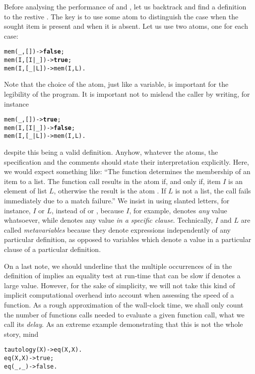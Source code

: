 Before analysing the performance of  and
, let us backtrack and find a definition to the
restive . The key is to use some atom to distinguish
the case when the sought item is present and when it is absent. Let us
use two atoms, one for each case:
\begin{alltt}
mem(_,   []) -> \textbf{false};
mem(I,[I|_]) -> \textbf{true};
mem(I,[_|L]) -> mem(I,L).
\end{alltt}
Note that the choice of the atom, just like a variable, is important
for the legibility of the program. It is important not to mislead the
caller by writing, for instance
\begin{alltt}
mem(_,   []) -> \textbf{true};
mem(I,[I|_]) -> \textbf{false};
mem(I,[_|L]) -> mem(I,L).
\end{alltt}
despite this being a valid definition. Anyhow, whatever the atoms, the
specification and the comments should state their interpretation
explicitly. Here, we would expect something like: ``The function
 determines the membership of an item to a list. The
function call  results in the atom
 if, and only if, item \(I\) is an element of list
\(L\), otherwise the result is the atom . If \(L\) is
not a list, the call fails immediately due to a match failure.'' We
insist in using slanted letters, for instance, \(I\) or \(L\), instead of
 or , because \(I\), for example, denotes
\emph{any} \Erlang value whatsoever, while  denotes any
\Erlang value \emph{in a specific clause}. Technically, \(I\) and
\(L\) are called \emph{metavariables} because they denote \Erlang
expressions independently of any particular definition, as opposed to
variables which denote a value in a particular clause of a particular
definition.

On a last note, we should underline that the multiple occurrences of
 in the definition of  implies an equality
test at run\hyp{}time that can be slow if  denotes a large
value. However, for the sake of simplicity, we will not take this kind
of implicit computational overhead into account when assessing the
speed of a function. As a rough approximation of the wall\hyp{}clock
time, we shall only count the number of functions calls needed to
evaluate a given function call, what we call its \emph{delay}. As an
extreme example demonstrating that this is not the whole story, mind
\begin{alltt}
tautology(X) -> eq(X,X).
eq(X,X) -> true;
eq(_,_) -> false.
\end{alltt}

